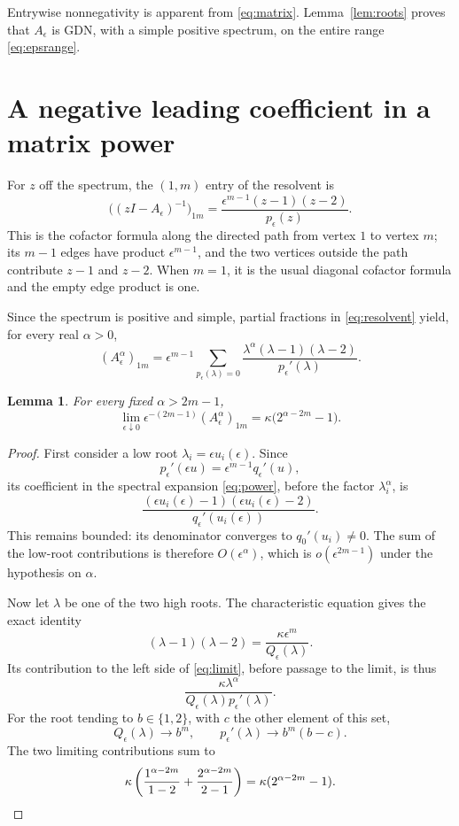 \documentclass[11pt]{article}
\newtheorem{lemma}[theorem]{Lemma}
\begin{document}
Entrywise nonnegativity is apparent from \eqref{eq:matrix}. Lemma~\ref{lem:roots} proves that $A_\epsilon$ is GDN, with a simple positive spectrum, on the entire range \eqref{eq:epsrange}.

\section{A negative leading coefficient in a matrix power}
For $z$ off the spectrum, the $(1,m)$ entry of the resolvent is
\begin{equation}\label{eq:resolvent}
\bigl((zI-A_\epsilon)^{-1}\bigr)_{1m}
=\frac{\epsilon^{m-1}(z-1)(z-2)}{p_\epsilon(z)}.
\end{equation}
This is the cofactor formula along the directed path from vertex $1$ to vertex $m$; its $m-1$ edges have product $\epsilon^{m-1}$, and the two vertices outside the path contribute $z-1$ and $z-2$. When $m=1$, it is the usual diagonal cofactor formula and the empty edge product is one.

Since the spectrum is positive and simple, partial fractions in \eqref{eq:resolvent} yield, for every real $\alpha>0$,
\begin{equation}\label{eq:power}
(A_\epsilon^\alpha)_{1m}
=\epsilon^{m-1}\sum_{p_\epsilon(\lambda)=0}
\frac{\lambda^\alpha(\lambda-1)(\lambda-2)}{p_\epsilon'(\lambda)}.
\end{equation}

\begin{lemma}\label{lem:limit}
For every fixed $\alpha>2m-1$,
\begin{equation}\label{eq:limit}
\lim_{\epsilon\downarrow0}\epsilon^{-(2m-1)}(A_\epsilon^\alpha)_{1m}
=\kappa\bigl(2^{\alpha-2m}-1\bigr).
\end{equation}
\end{lemma}
\begin{proof}
First consider a low root $\lambda_i=\epsilon u_i(\epsilon)$. Since
\[
p_\epsilon'(\epsilon u)=\epsilon^{m-1}q_\epsilon'(u),
\]
its coefficient in the spectral expansion \eqref{eq:power}, before the factor $\lambda_i^\alpha$, is
\[
\frac{(\epsilon u_i(\epsilon)-1)(\epsilon u_i(\epsilon)-2)}
{q_\epsilon'(u_i(\epsilon))}.
\]
This remains bounded: its denominator converges to $q_0'(u_i)\ne0$. The sum of the low-root contributions is therefore $O(\epsilon^\alpha)$, which is $o(\epsilon^{2m-1})$ under the hypothesis on $\alpha$.

Now let $\lambda$ be one of the two high roots. The characteristic equation gives the exact identity
\[
(\lambda-1)(\lambda-2)=\frac{\kappa\epsilon^m}{Q_\epsilon(\lambda)}.
\]
Its contribution to the left side of \eqref{eq:limit}, before passage to the limit, is thus
\[
\frac{\kappa\lambda^\alpha}{Q_\epsilon(\lambda)p_\epsilon'(\lambda)}.
\]
For the root tending to $b\in\{1,2\}$, with $c$ the other element of this set,
\[
Q_\epsilon(\lambda)\longrightarrow b^m,
\qquad p_\epsilon'(\lambda)\longrightarrow b^m(b-c).
\]
The two limiting contributions sum to
\[
\kappa\left(\frac{1^{\alpha-2m}}{1-2}
+\frac{2^{\alpha-2m}}{2-1}\right)
=\kappa(2^{\alpha-2m}-1).
\qedhere
\]
\end{proof}
\end{document}
